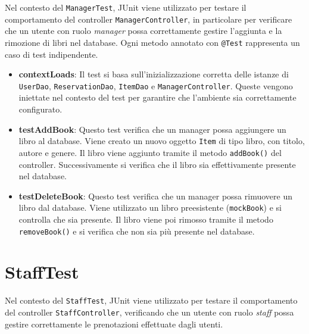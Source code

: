\documentclass[twoside,openright,titlepage,fleqn,headinclude,12pt,a4paper,BCOR=5mm,footinclude]{scrbook}
\begin{document}
Nel contesto del \texttt{ManagerTest}, JUnit viene utilizzato per testare il comportamento del controller \texttt{ManagerController}, in particolare per verificare che un utente con ruolo \textit{manager} possa correttamente gestire l’aggiunta e la rimozione di libri nel database.
 Ogni metodo annotato con \texttt{@Test} rappresenta un caso di test indipendente.

\begin{itemize}
    \item \textbf{contextLoads}: Il test si basa sull’inizializzazione corretta delle istanze di \texttt{UserDao}, \texttt{ReservationDao}, \texttt{ItemDao} e \texttt{ManagerController}. Queste vengono iniettate nel contesto del test per garantire che l’ambiente sia correttamente configurato.

    \item \textbf{testAddBook}: Questo test verifica che un manager possa aggiungere un libro al database. Viene creato un nuovo oggetto \texttt{Item} di tipo libro, con titolo, autore e genere. Il libro viene aggiunto tramite il metodo \texttt{addBook()} del controller. Successivamente si verifica che il libro sia effettivamente presente nel database.

    \item \textbf{testDeleteBook}: Questo test verifica che un manager possa rimuovere un libro dal database. Viene utilizzato un libro preesistente (\texttt{mockBook}) e si controlla che sia presente. Il libro viene poi rimosso tramite il metodo \texttt{removeBook()} e si verifica che non sia più presente nel database.

\end{itemize}

\bigskip


\section{StaffTest}

Nel contesto del \texttt{StaffTest}, JUnit viene utilizzato per testare il comportamento del controller \texttt{StaffController}, verificando che un utente con ruolo \textit{staff} possa gestire correttamente le prenotazioni effettuate dagli utenti.
\end{document}
